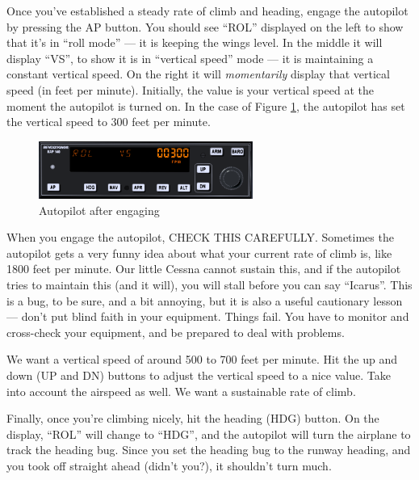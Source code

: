 Once you've established a steady rate of climb and heading, engage the
autopilot by pressing the AP button.  You should see ``ROL'' displayed
on the left to show that it's in ``roll mode'' --- it is keeping the
wings level.  In the middle it will display ``VS'', to show it is in
``vertical speed'' mode --- it is maintaining a constant vertical
speed.  On the right it will \emph{momentarily} display that vertical
speed (in feet per minute).  Initially, the value is your vertical
speed at the moment the autopilot is turned on.  In the case of Figure
\ref{fig:ap_vs}, the autopilot has set the vertical speed to 300 feet
per minute.

\begin{figure}
  \begin{center}
    \includegraphics[width=7cm]{img/ap_vs}
    \caption{Autopilot after engaging}
    \label{fig:ap_vs}
  \end{center}
\end{figure}


When you engage the autopilot, CHECK THIS CAREFULLY.  Sometimes the
autopilot gets a very funny idea about what your current rate of climb
is, like 1800 feet per minute.  Our little Cessna cannot sustain this,
and if the autopilot tries to maintain this (and it will), you will
stall before you can say ``Icarus''.  This is a bug, to be sure, and a
bit annoying, but it is also a useful cautionary lesson --- don't put
blind faith in your equipment.  Things fail.  You have to monitor and
cross-check your equipment, and be prepared to deal with problems.

We want a vertical speed of around 500 to 700 feet per minute.  Hit
the up and down (UP and DN) buttons to adjust the vertical speed to a
nice value.  Take into account the airspeed as well.  We want a
sustainable rate of climb.

Finally, once you're climbing nicely, hit the heading (HDG)
button.  On the display, ``ROL'' will change to ``HDG'',
and the autopilot will turn the airplane to track the heading bug.
Since you set the heading bug to the runway heading, and you took off
straight ahead (didn't you?), it shouldn't turn much.

